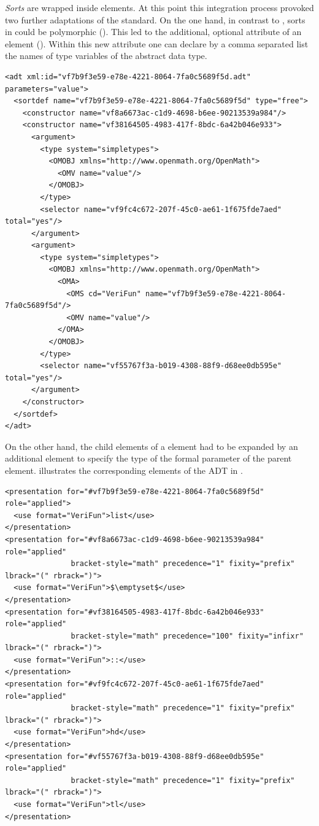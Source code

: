 {\emph{Sorts}} are wrapped inside {} elements. At this point this integration
process provoked two further adaptations of the {\omdoc} standard. On the one hand, in
contrast to {\omdoc}, sorts in {\verifun} could be polymorphic (). This
led to the additional, optional {} attribute of an
{} element (). Within this new attribute one can declare
by a comma separated list the names of type variables of the abstract data type.
\begin{lstlisting}[label=lst:omdoc:adt,caption={A polymorphic {\omdoc} ADT}]
<adt xml:id="vf7b9f3e59-e78e-4221-8064-7fa0c5689f5d.adt" parameters="value">
  <sortdef name="vf7b9f3e59-e78e-4221-8064-7fa0c5689f5d" type="free">
    <constructor name="vf8a6673ac-c1d9-4698-b6ee-90213539a984"/>
    <constructor name="vf38164505-4983-417f-8bdc-6a42b046e933">
      <argument>
        <type system="simpletypes">
          <OMOBJ xmlns="http://www.openmath.org/OpenMath">
            <OMV name="value"/>
          </OMOBJ>
        </type>
        <selector name="vf9fc4c672-207f-45c0-ae61-1f675fde7aed" total="yes"/>
      </argument>
      <argument>
        <type system="simpletypes">
          <OMOBJ xmlns="http://www.openmath.org/OpenMath">
            <OMA>
              <OMS cd="VeriFun" name="vf7b9f3e59-e78e-4221-8064-7fa0c5689f5d"/>
              <OMV name="value"/>
            </OMA>
          </OMOBJ>
        </type>
        <selector name="vf55767f3a-b019-4308-88f9-d68ee0db595e" total="yes"/>
      </argument>
    </constructor>
  </sortdef>
</adt>
\end{lstlisting}
On the other hand, the child elements of a {} element had to be
expanded by an additional {} element to specify the type of the formal
parameter of the parent {} element. {}
illustrates the corresponding {} elements of the ADT in
{}.
\begin{lstlisting}[escapechar=\%,mathescape,label=lst:omdoc:pres,caption={Representation of {\verifun} names to {\omdoc}}]
<presentation for="#vf7b9f3e59-e78e-4221-8064-7fa0c5689f5d" role="applied">
  <use format="VeriFun">list</use>
</presentation>
<presentation for="#vf8a6673ac-c1d9-4698-b6ee-90213539a984" role="applied"
               bracket-style="math" precedence="1" fixity="prefix" lbrack="(" rbrack=")">
  <use format="VeriFun">$\emptyset$</use>
</presentation>
<presentation for="#vf38164505-4983-417f-8bdc-6a42b046e933" role="applied" 
               bracket-style="math" precedence="100" fixity="infixr" lbrack="(" rbrack=")">
  <use format="VeriFun">::</use>
</presentation>
<presentation for="#vf9fc4c672-207f-45c0-ae61-1f675fde7aed" role="applied"
               bracket-style="math" precedence="1" fixity="prefix" lbrack="(" rbrack=")">
  <use format="VeriFun">hd</use>
</presentation>
<presentation for="#vf55767f3a-b019-4308-88f9-d68ee0db595e" role="applied"
               bracket-style="math" precedence="1" fixity="prefix" lbrack="(" rbrack=")">
  <use format="VeriFun">tl</use>
</presentation>
\end{lstlisting}  


